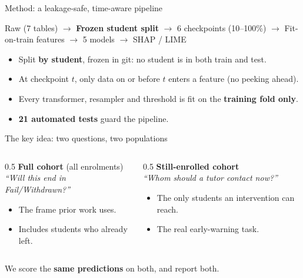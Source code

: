 \documentclass[aspectratio=169,11pt]{beamer}
\begin{document}
\begin{frame}{Method: a leakage-safe, time-aware pipeline}
\begin{center}\small\color{themecol}
Raw (7 tables) $\rightarrow$ \textbf{Frozen student split} $\rightarrow$ 6 checkpoints (10--100\%)
$\rightarrow$ Fit-on-train features $\rightarrow$ 5 models $\rightarrow$ SHAP / LIME
\end{center}
\vspace{0.3em}
\begin{itemize}
  \item Split \textbf{by student}, frozen in git: no student is in both train and test.
  \item At checkpoint $t$, only data on or before $t$ enters a feature (no peeking ahead).
  \item Every transformer, resampler and threshold is fit on the \textbf{training fold only}.
  \item \textbf{21 automated tests} guard the pipeline.
\end{itemize}
\end{frame}

\begin{frame}{The key idea: two questions, two populations}
\begin{columns}
\begin{column}{0.5\textwidth}
\textbf{Full cohort} (all enrolments)\\
\footnotesize\emph{``Will this end in Fail/Withdrawn?''}
\begin{itemize}\footnotesize
  \item The frame prior work uses.
  \item Includes students who already left.
\end{itemize}
\end{column}
\begin{column}{0.5\textwidth}
\textbf{Still-enrolled cohort}\\
\footnotesize\emph{``Whom should a tutor contact now?''}
\begin{itemize}\footnotesize
  \item The only students an intervention can reach.
  \item The real early-warning task.
\end{itemize}
\end{column}
\end{columns}
\vspace{0.5em}
\begin{block}{}\centering\color{themecol} We score the \textbf{same predictions} on both, and report both.\end{block}
\end{frame}
\end{document}
